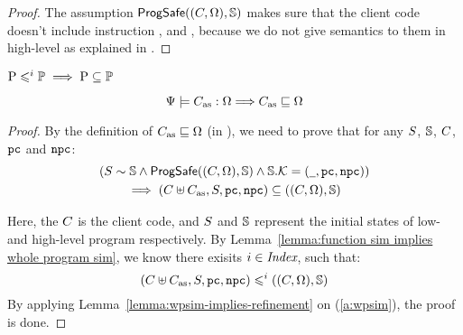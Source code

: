 {\begin{proof}
    The assumption $\textsf{ProgSafe}((C, \Omega), \mathbb{S})$
    makes sure that the client code doesn't include instruction
    \csave{}, \crestore{} and \cwr{}, because we do not give
    semantics to them in high-level as explained in
    \Sec{\ref{subsec:High-level Pseudo-SPARCv8 Language}}.
\end{proof}

\begin{lemma}
    \label{lemma:wpsim-implies-refinement}
    \em
    $\text{P} \leqslant^{i} \mathbb{P} \implies \text{P} \subseteq \mathbb{P}$
\end{lemma}

\begin{lemma}
    \em
    \label{lemma:Simulation Implies Primitive Correctness}
    \[
        {\Psi} \models {C_{\text{as}}} : {\Omega}
        \Longrightarrow
        C_{\text{as}} \sqsubseteq \Omega
    \]
\end{lemma}
\begin{proof}
    By the definition of $C_{\text{as}} \sqsubseteq \Omega$
    (in \Def{\ref{def:prim-correctness}}), we need to prove
    that for any $S$, $\mathbb{S}$, $C$, $\texttt{pc}$ and
    $\texttt{npc}$:
    \begin{multline*}
        ({S} \sim {\mathbb{S}} \land
        \textsf{ProgSafe}((C, \Omega), \mathbb{S}) \land
        \mathbb{S}.\mathcal{K} = (\underline{\ \,}, \texttt{pc}, \texttt{npc})) \\
        \implies
        (C\uplus C_{\text{as}}, S, \texttt{pc}, \texttt{npc})
        \subseteq
        ((C, \Omega), \mathbb{S})
    \end{multline*}

    Here, the $C$ is the client code, and
    $S$ and $\mathbb{S}$ represent the initial states
    of low- and high-level program respectively.
    By Lemma~\ref{lemma:function sim implies whole program sim},
    we know there exisits $i \in \textit{Index}$, such that:
    \begin{equation}
        (C\uplus C_{\text{as}}, S, \texttt{pc}, \texttt{npc})
        \leqslant^{i}
        ((C, \Omega), \mathbb{S}) \label{a:wpsim}
    \end{equation}
    By applying Lemma~\ref{lemma:wpsim-implies-refinement}
    on (\ref{a:wpsim}), the proof is done.
\end{proof}

}
